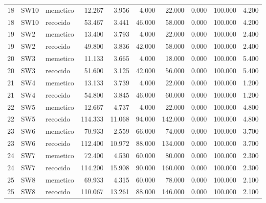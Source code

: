 \documentclass{article}
\begin{document}
\begin{table}[H]
{\begin{tabular}{rllrrrrrrr}
18 & SW10 & memetico & 12.267 & 3.956 & 4.000 & 22.000 & 0.000 & 100.000 & 4.200 \\
18 & SW10 & recocido & 53.467 & 3.441 & 46.000 & 58.000 & 0.000 & 100.000 & 4.200 \\
19 & SW2 & memetico & 13.400 & 3.793 & 4.000 & 22.000 & 0.000 & 100.000 & 2.400 \\
19 & SW2 & recocido & 49.800 & 3.836 & 42.000 & 58.000 & 0.000 & 100.000 & 2.400 \\
20 & SW3 & memetico & 11.133 & 3.665 & 4.000 & 18.000 & 0.000 & 100.000 & 5.400 \\
20 & SW3 & recocido & 51.600 & 3.125 & 42.000 & 56.000 & 0.000 & 100.000 & 5.400 \\
21 & SW4 & memetico & 13.133 & 3.739 & 4.000 & 22.000 & 0.000 & 100.000 & 1.200 \\
21 & SW4 & recocido & 54.800 & 3.845 & 46.000 & 60.000 & 0.000 & 100.000 & 1.200 \\
22 & SW5 & memetico & 12.667 & 4.737 & 4.000 & 22.000 & 0.000 & 100.000 & 4.800 \\
22 & SW5 & recocido & 114.333 & 11.068 & 94.000 & 142.000 & 0.000 & 100.000 & 4.800 \\
23 & SW6 & memetico & 70.933 & 2.559 & 66.000 & 74.000 & 0.000 & 100.000 & 3.700 \\
23 & SW6 & recocido & 112.400 & 10.972 & 88.000 & 134.000 & 0.000 & 100.000 & 3.700 \\
24 & SW7 & memetico & 72.400 & 4.530 & 60.000 & 80.000 & 0.000 & 100.000 & 2.300 \\
24 & SW7 & recocido & 114.200 & 15.908 & 90.000 & 160.000 & 0.000 & 100.000 & 2.300 \\
25 & SW8 & memetico & 69.933 & 4.315 & 60.000 & 78.000 & 0.000 & 100.000 & 2.100 \\
25 & SW8 & recocido & 110.067 & 13.261 & 88.000 & 146.000 & 0.000 & 100.000 & 2.100 \\
\bottomrule
\end{tabular}
}
\end{table}
\end{document}
